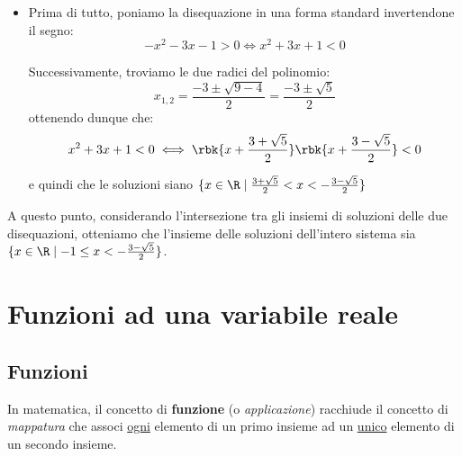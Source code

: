 \documentclass[a4paper, 12pt]{report}
\begin{document}
\begin{enumerate}
\begin{itemize}
\begin{itemize}
                Ottenendo quindi una condizione equivalente a quella di partenza. Per tanto, la disequazione risulta vera quando $x \geq 1$.

                \item Se $x+1 < 0$ allora:
                \[\abs{x+1} - 2x \leq 2 \iff -x-1 -2x \leq 2 \iff x \geq -1\]

                Tuttavia, unendo le due condizioni notiamo che $x < -1$ e $x \geq -1$, il che risulta impossibile. Per tanto, in questo caso la disequazione risulta falsa.
            \end{itemize}

            Dunque, concludiamo che le soluzioni siano $\{x \in \R \mid x \geq -1\}$

            \item Prima di tutto, poniamo la disequazione in una forma standard invertendone il segno:
            \[-x^2-3x-1 > 0 \iff x^2+3x+1 < 0\]

            Successivamente, troviamo le due radici del polinomio:
            \[x_{1,2} = \frac{-3 \pm \sqrt{9-4}}{2} = \frac{-3 \pm \sqrt{5}}{2}\]
            ottenendo dunque che:
            \[x^2+3x+1 < 0 \iff \rbk{x+\frac{3 + \sqrt{5}}{2}}\rbk{x+\frac{3 - \sqrt{5}}{2}} < 0 \]

            e quindi che le soluzioni siano $\{x \in \R \mid \frac{3 + \sqrt{5}}{2} < x < -\frac{3 - \sqrt{5}}{2}\}$
        \end{itemize}

        A questo punto, considerando l'intersezione tra gli insiemi di soluzioni delle due disequazioni, otteniamo che l'insieme delle soluzioni dell'intero sistema sia $\{ x \in \R \mid -1 \leq x < -\frac{3 - \sqrt{5}}{2}\}$.
        
    \end{enumerate}


    \chapter{Funzioni ad una variabile reale}

    \section{Funzioni}

    In matematica, il concetto di \textbf{funzione} (o \textit{applicazione}) racchiude il concetto di \textit{mappatura} che associ \underline{ogni} elemento di un primo insieme ad un \underline{unico} elemento di un secondo insieme. 
\end{document}
